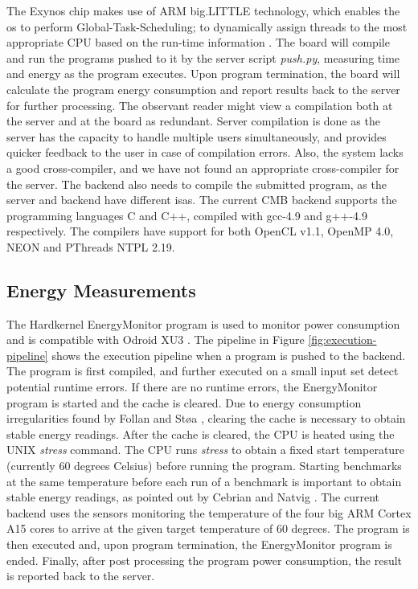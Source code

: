 The Exynos chip makes use of ARM big.LITTLE technology, which enables the \gls{os} to perform Global-Task-Scheduling; to dynamically assign threads to the most appropriate CPU based on the run-time information \cite{ABL}. The board will compile and run the programs pushed to it by the server script \textit{push.py}, measuring time and energy as the program executes. Upon program termination, the board will calculate the program energy consumption and report results back to the server for further processing. The observant reader might view a compilation both at the server and at the board as redundant. Server compilation is done as the server has the capacity to handle multiple users simultaneously, and provides quicker feedback to the user in case of compilation errors. Also, the system lacks a good cross-compiler, and we have not found an appropriate cross-compiler for the server. The backend also needs to compile the submitted program, as the server and backend have different \gls{isa}s. The current CMB backend supports the programming languages C and C++, compiled with gcc-4.9 and g++-4.9 respectively. The compilers have support for both OpenCL v1.1, OpenMP 4.0, NEON and PThreads NTPL 2.19.


\subsection{Energy Measurements}
\label{sec:em-cmb}
The Hardkernel EnergyMonitor program is used to monitor power consumption and is compatible with Odroid XU3 \cite{OEM}. The pipeline in Figure \ref{fig:execution-pipeline} shows the execution pipeline when a program is pushed to the backend. The program is first compiled, and further executed on a small input set detect potential runtime errors. If there are no runtime errors, the EnergyMonitor program is started and the cache is cleared. Due to energy consumption irregularities found by Follan and Støa \cite{mt:T&S}, clearing the cache is necessary to obtain stable energy readings. After the cache is cleared, the CPU is heated using the UNIX \textit{stress} \cite{STRESS} command. The CPU runs \textit{stress} to obtain a fixed start temperature (currently 60 degrees Celsius) before running the program. Starting benchmarks at the same temperature before each run of a benchmark is important to obtain stable energy readings, as pointed out by Cebrian and Natvig \cite{a:JL:T}. The current backend uses the sensors monitoring the temperature of the four big ARM Cortex A15 cores to arrive at the given target temperature of 60 degrees. The program is then executed and, upon program termination, the EnergyMonitor program is ended. Finally, after post processing the program power consumption, the result is reported back to the server. \\

